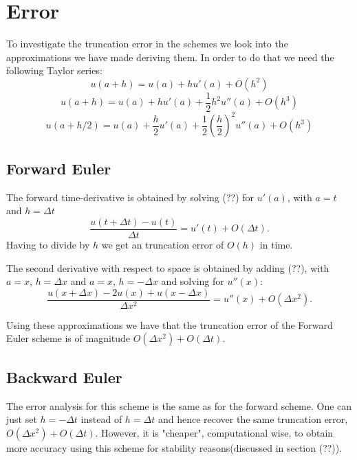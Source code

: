 \documentclass[11pt,a4paper,draft]{article}
\numberwithin{equation}{section}
\begin{document}
\section{Error}

To investigate the truncation error in the schemes we look into the approximations we have made deriving them. In order to do that we need the following Taylor series:
\begin{equation}
u(a+h) = u(a) +hu'(a)+O(h^2)
\end{equation}
\begin{equation}
u(a+h) = u(a) +hu'(a)+\frac{1}{2}h^2 u''(a) +O(h^3)
\end{equation}
\begin{equation}
u(a+h/2) = u(a) +\frac{h}{2}u'(a) + \frac{1}{2} \left( \frac{h}{2} \right)^2 u''(a) + O(h^3)
\end{equation}

\subsection{Forward Euler}
The forward time-derivative is obtained by solving (??) for $u'(a)$, with $a=t$ and $h=\Delta t$
\begin{equation}
\frac{u(t+\Delta t)-u(t)}{\Delta t} = u'(t)+O(\Delta t).
\end{equation}  
Having to divide by $h$ we get an truncation error of $O(h)$ in time.

The second derivative with respect to space is obtained by adding (??), with $a=x$,  $h=\Delta x$ and 
$a=x$,  $h= -\Delta x$ and solving for $u''(x)$:
\begin{equation}
\frac{u(x+\Delta x)-2u(x)+u(x-\Delta x)}{\Delta x^2} = u''(x)+O(\Delta x^2).
\end{equation}  

Using these approximations we have that the truncation error of the Forward Euler scheme is of magnitude $O(\Delta x^2)+O(\Delta t)$.  

\subsection{Backward Euler}
The error analysis for this scheme is the same as for the forward scheme. One can just set $h=- \Delta t$
instead of $h=\Delta t$ and hence recover the same truncation error, $O(\Delta x^2)+O(\Delta t)$. However, it is "cheaper", computational wise, to obtain more accuracy using this scheme for stability reasons(discussed in section (??)). 
\end{document}
